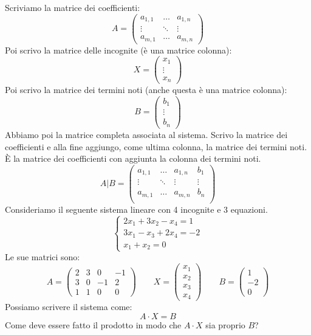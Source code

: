 Scriviamo la matrice dei coefficienti:
\[
A =
\begin{pmatrix}
a_{1,1} & \dots & a_{1,n} \\
\vdots & \ddots & \vdots \\
a_{m,1} & \dots & a_{m,n}
\end{pmatrix}
\]
Poi scrivo la matrice delle incognite (\`e una matrice colonna):
\[
X =
\begin{pmatrix}
x_1 \\
\vdots \\
x_n
\end{pmatrix}
\]
Poi scrivo la matrice dei termini noti (anche questa \`e una matrice colonna):
\[
B =
\begin{pmatrix}
b_1 \\
\vdots \\
b_n
\end{pmatrix}
\]
Abbiamo poi la matrice completa associata al sistema. Scrivo la matrice dei coefficienti e alla fine aggiungo, come ultima colonna, la matrice dei termini noti. \`E la matrice dei coefficienti con aggiunta la colonna dei termini noti.
\[
A | B =
\begin{pmatrix}
a_{1,1} & \dots & a_{1,n} & b_1 \\
\vdots & \ddots & \vdots & \vdots \\
a_{m,1} & \dots & a_{m,n} & b_n \\
\end{pmatrix}
\]
Consideriamo il seguente sistema lineare con 4 incognite e 3 equazioni.
\[
\begin{cases}
2 x_1 + 3 x_2 - x_4 = 1 \\
3 x_1 - x_3 + 2 x_4 = -2 \\
x_1 + x_2 = 0
\end{cases}
\]
Le sue matrici sono:
\[
A =
\begin{pmatrix}
2 & 3 & 0 & -1 \\
3 & 0 & -1 & 2 \\
1 & 1 & 0 & 0
\end{pmatrix}
\qquad
X = 
\begin{pmatrix}
x_1 \\
x_2 \\
x_3 \\
x_4
\end{pmatrix}
\qquad
B = 
\begin{pmatrix}
1 \\
-2 \\
0
\end{pmatrix}
\]
Possiamo scrivere il sistema come:
\[
A \cdot X = B
\]
Come deve essere fatto il prodotto in modo che $A \cdot X$ sia proprio $B$?

